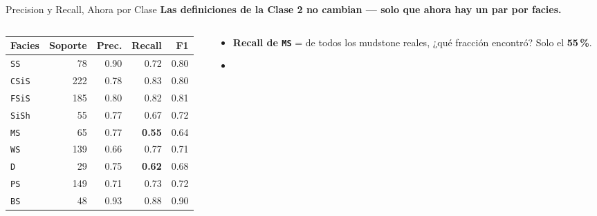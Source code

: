 \documentclass[aspectratio=169, 11pt]{beamer}
\begin{document}
\begin{frame}[shrink=14]{Precision y Recall, Ahora por Clase}
  \vspace{-4pt}
  {\small\color{arcaDark}\bfseries
    Las definiciones de la Clase 2 no cambian --- solo que ahora hay un par por facies.}

  \vspace{4pt}
  \begin{columns}[T]
    \begin{column}{0.5\textwidth}
      {\footnotesize
      \begin{tabular}{@{}lrrrr@{}}
        \toprule
        {\color{arcaDark}\bfseries Facies} & {\color{arcaDark}\bfseries Soporte} &
        {\color{arcaDark}\bfseries Prec.} & {\color{arcaDark}\bfseries Recall} &
        {\color{arcaDark}\bfseries F1} \\
        \midrule
        \texttt{SS}   &  78 & 0.90 & 0.72 & 0.80 \\
        \texttt{CSiS} & 222 & 0.78 & 0.83 & 0.80 \\
        \texttt{FSiS} & 185 & 0.80 & 0.82 & 0.81 \\
        \texttt{SiSh} &  55 & 0.77 & 0.67 & 0.72 \\
        {\color{arcaRed}\texttt{MS}} & {\color{arcaRed}65} & {\color{arcaRed}0.77}
          & {\color{arcaRed}\bfseries 0.55} & {\color{arcaRed}0.64} \\
        \texttt{WS}   & 139 & 0.66 & 0.77 & 0.71 \\
        {\color{arcaRed}\texttt{D}} & {\color{arcaRed}29} & {\color{arcaRed}0.75}
          & {\color{arcaRed}\bfseries 0.62} & {\color{arcaRed}0.68} \\
        \texttt{PS}   & 149 & 0.71 & 0.73 & 0.72 \\
        \texttt{BS}   &  48 & 0.93 & 0.88 & 0.90 \\
        \bottomrule
      \end{tabular}
      }
    \end{column}
    \begin{column}{0.46\textwidth}
      {\scriptsize\color{textMuted}
      \begin{itemize}\setlength{\itemsep}{5pt}
        \item[{\color{arcaRed}\scriptsize\faArrowRight}]
          \textbf{Recall de \texttt{MS}} = de todos los mudstone reales,
          ¿qué fracción encontró? Solo el \textbf{55\,\%}.
        \item[{\color{arcaRed}\scriptsize\faArrowRight}]

\end{itemize}}
\end{column}
\end{columns}
\end{frame}
\end{document}
